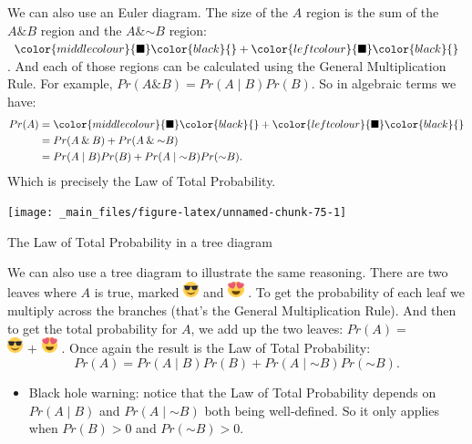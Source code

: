 \documentclass[justified]{tufte-book}
\newcommand{\given}{\mid}
\renewcommand{\neg}{\mathbin{\sim}}
\renewcommand{\wedge}{\mathbin{\&}}
\newcommand{\gt}{>}
\newcommand{\p}{Pr}
\newenvironment{warning}{\begin{itemize}\item[\faBan]}{\end{itemize}}
\theoremstyle{definition}
\theoremstyle{definition}
\theoremstyle{definition}
\theoremstyle{remark}
\begin{document}
We can also use an Euler diagram. The size of the \(A\) region is the
sum of the \(A \wedge B\) region and the \(A \wedge \neg B\) region:
\(\color{middlecolour}{\blacksquare}\color{black}{} + \color{leftcolour}{\blacksquare}\color{black}{}\).
And each of those regions can be calculated using the General
Multiplication Rule. For example,
\(\p(A \wedge B) = \p(A \given B) \p(B)\). So in algebraic terms we
have: \[
  \begin{aligned}
    \p(A) &= \color{middlecolour}{\blacksquare}\color{black}{} 
             + \color{leftcolour}{\blacksquare}\color{black}{}\\
          &= \p(A \wedge B) + \p(A \wedge \neg B)\\
          &= \p(A \given B) \p(B) + \p(A \given \neg B) \p(\neg B).
  \end{aligned}
\] Which is precisely the Law of Total Probability.

\begin{marginfigure}
\texttt{[image: \_main\_files/figure-latex/unnamed-chunk-75-1]} \caption[The Law of Total Probability in a tree diagram]{The Law of Total Probability in a tree diagram}\label{fig:unnamed-chunk-75}
\end{marginfigure}

We can also use a tree diagram to illustrate the same reasoning. There
are two leaves where \(A\) is true, marked
\includegraphics[width=0.18in]{img/emoji_shades_small} and
\includegraphics[width=0.18in]{img/emoji_hearts_small} . To get the
probability of each leaf we multiply across the branches (that's the
General Multiplication Rule). And then to get the total probability for
\(A\), we add up the two leaves: \(\p(A) =\)\\
\includegraphics[width=0.18in]{img/emoji_shades_small} \(+\)
\includegraphics[width=0.18in]{img/emoji_hearts_small} . Once again the
result is the Law of Total Probability: \[
  \p(A) = \p(A \given B) \p(B) + \p(A \given \neg B) \p(\neg B).
\]

\begin{warning}
Black hole warning: notice that the Law of Total Probability depends on
\(\p(A \given B)\) and \(\p(A \given \neg B)\) both being well-defined.
So it only applies when \(\p(B) \gt 0\) and \(\p(\neg B) \gt 0\).
\end{warning}
\end{document}

